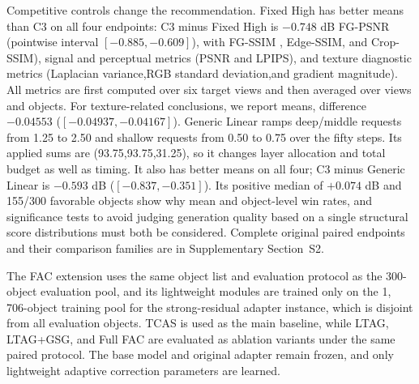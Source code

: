 \documentclass[times,twocolumn,final]{elsarticle}
\providecommand{\DIFadd}[1]{{\protect\color{blue} \sf #1}} %
\providecommand{\DIFdel}[1]{{\protect\color{red} \scriptsize #1}} %
\providecommand{\DIFaddbegin}{} %
\providecommand{\DIFaddend}{} %
\providecommand{\DIFdelbegin}{} %
\providecommand{\DIFdelend}{} %
\begin{document}
\DIFadd{Competitive controls change the recommendation. Fixed High has better means than C3 on all four endpoints: C3 minus Fixed High is $-0.748$ dB FG-PSNR (pointwise interval $[-0.885,-0.609]$), with }\DIFaddend FG-SSIM \DIFdelbegin \DIFdel{, Edge-SSIM, and Crop-SSIM), signal and perceptual metrics (PSNR and LPIPS), and texture diagnostic metrics (Laplacian variance,RGB standard deviation,and gradient magnitude). All metrics are first computed over six target views and then averaged over views and objects. For texture-related conclusions, we report means, }\DIFdelend \DIFaddbegin \DIFadd{difference $-0.04553$ ($[-0.04937,-0.04167]$). Generic Linear ramps deep/middle requests from 1.25 to 2.50 and shallow requests from 0.50 to 0.75 over the fifty steps. Its applied sums are (93.75,93.75,31.25), so it changes layer allocation and total budget as well as timing. It also has better means on all four; C3 minus Generic Linear is $-0.593$ dB ($[-0.837,-0.351]$). Its positive median of $+0.074$ dB and 155/300 favorable objects show why mean and }\DIFaddend object-level \DIFdelbegin \DIFdel{win rates, and significance tests to avoid judging generation quality based on a single structural score}\DIFdelend \DIFaddbegin \DIFadd{distributions must both be considered. Complete original paired endpoints and their comparison families are in Supplementary Section~S2}\DIFaddend .

\DIFdelbegin \DIFdel{The FAC extension uses the same object list and evaluation protocol as the 300-object evaluation pool, and its lightweight modules are trained only on the 1, 706-object training pool for the strong-residual adapter instance, which is disjoint from all evaluation objects. TCAS is used as the main baseline, while LTAG, LTAG+GSG, and Full FAC are evaluated as ablation variants under the same paired protocol. The base model and original adapter remain frozen, and only lightweight adaptive correction parameters are learned. }%

\end{document}
